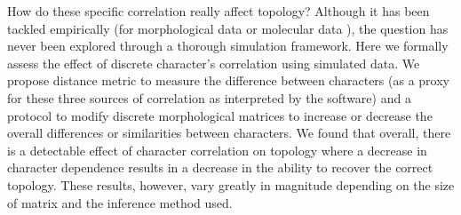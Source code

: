 \documentclass[12pt,letterpaper]{article}
\begin{document}
How do these specific correlation really affect topology?
Although it has been tackled empirically (for morphological data \citealt{Davalos01072014} or molecular data \citealt{ZouConvergence}), the question has never been explored through a thorough simulation framework.
Here we formally assess the effect of discrete character's correlation using simulated data.
We propose %
distance metric to measure the difference between characters (as a proxy for these three sources of correlation as interpreted by the software) and a protocol to modify discrete morphological matrices to increase or decrease the overall differences or similarities between characters.
We found that overall, there is a detectable effect of character correlation on topology where a decrease in character dependence results in a decrease in the ability to recover the correct topology.
These results, however, vary greatly in magnitude depending on the size of matrix and the inference method used.
\end{document}
